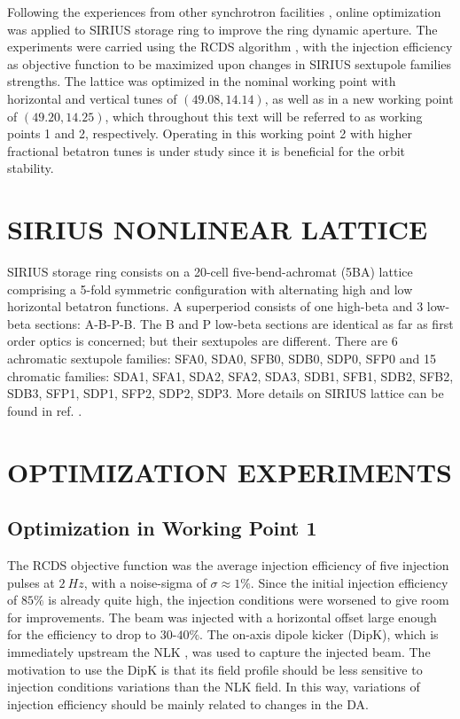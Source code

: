 \documentclass[a4paper,
               keeplastbox,   %
               ]{jacow}
\begin{document}
Following the experiences from other synchrotron facilities \cite{Huang:2015, Liuzzo:IPAC2016-THPMR015, Olsson:IPAC2018-WEPAL047, yang:ipac2022-tupopt064}, online optimization was applied to SIRIUS storage ring to improve the ring dynamic aperture. The experiments were carried using the RCDS algorithm \cite{Huang:2013}, with the injection efficiency as objective function to be maximized upon changes in SIRIUS sextupole families strengths. The lattice was optimized in the nominal working point with horizontal and vertical tunes of $(49.08, 14.14)$, as well as in a new working point of $(49.20, 14.25)$, which throughout this text will be referred to as working points 1 and 2, respectively. Operating in this working point 2 with higher fractional betatron tunes is under study since it is beneficial for the orbit stability.

\section{SIRIUS NONLINEAR LATTICE}
 SIRIUS storage ring consists on a 20-cell five-bend-achromat (5BA) lattice 
 comprising a 5-fold symmetric configuration with alternating high and low horizontal betatron functions. A superperiod consists of one high-beta and 3 low-beta sections: A-B-P-B. The B and P low-beta sections are identical as far as first order optics is concerned; but their sextupoles are different. There are 6 achromatic sextupole families: SFA0, SDA0, SFB0, SDB0, SDP0, SFP0 and 15 chromatic families: SDA1, SFA1, SDA2, SFA2, SDA3, SDB1, SFB1, SDB2, SFB2, SDB3, SFP1, SDP1, SFP2, SDP2, SDP3. More details on SIRIUS lattice can be found in ref. \cite{Liu:IPAC2016-THPMR013}.

\section{OPTIMIZATION EXPERIMENTS}

\subsection{Optimization in Working Point 1}
The RCDS objective function was the average injection efficiency of five injection pulses at $2~\unit{Hz}$, with a noise-sigma of $\sigma \approx 1\%$. Since the initial injection efficiency of $85\%$ is already quite high, the injection conditions were worsened to give room for improvements. The beam was injected with a horizontal offset large enough for the efficiency to drop to $30$-$40\%$. The on-axis dipole kicker (DipK), which is immediately upstream the NLK \cite{Liu:IPAC2016-THPMR011}, was used to capture the injected beam. The motivation to use the DipK is that its field profile should be less sensitive to injection conditions variations than the NLK field. In this way, variations of injection efficiency should be mainly related to changes in the DA.
\end{document}
